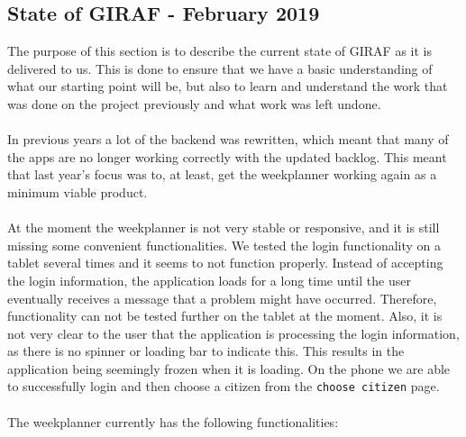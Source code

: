 \subsection{State of GIRAF - February 2019}
The purpose of this section is to describe the current state of GIRAF as it is delivered to us.
This is done to ensure that we have a basic understanding of what our starting point will be, but also to learn and understand the work that was done on the project previously and what work was left undone.
\\\\
In previous years a lot of the backend was rewritten, which meant that many of the apps are no longer working correctly with the updated backlog.
This meant that last year's focus was to, at least, get the weekplanner working again as a minimum viable product.
\\\\
At the moment the weekplanner is not very stable or responsive, and it is still missing some convenient functionalities.
We tested the login functionality on a tablet several times and it seems to not function properly.
Instead of accepting the login information, the application loads for a long time until the user eventually receives a message that a problem might have occurred.
Therefore, functionality can not be tested further on the tablet at the moment.
Also, it is not very clear to the user that the application is processing the login information, as there is no spinner or loading bar to indicate this.
This results in the application being seemingly frozen when it is loading.
On the phone we are able to successfully login and then choose a citizen from the \texttt{choose citizen} page.
\\\\
The weekplanner currently has the following functionalities:
